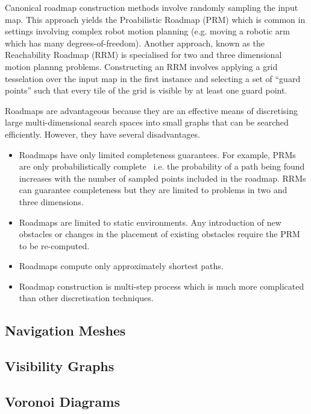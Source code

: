 Canonical roadmap construction methods involve randomly sampling the input map. 
This approach yields the Proabilistic Roadmap (PRM) which is common in settings 
involving complex robot motion planning (e.g. moving a robotic arm which has many 
degrees-of-freedom).
Another approach, known as the Reachability Roadmap (RRM) is specialised for two 
and three dimensional motion plannng problems.
Constructing an RRM involves applying a grid tesselation over the input map in the 
first instance and selecting a set of ``guard points'' such that every tile of the 
grid is visible by at least one guard point.

Roadmaps are advantageous because they are an effective means of discretising large
multi-dimensional search spaces into small graphs that can be searched 
efficiently. However, they have several disadvantages. 
\begin{itemize}
\item{Roadmaps have only limited completeness guarantees. For example, PRMs are only 
probabilistically complete~\citep{barraquand97} i.e. the probability 
of a path being found increases with the number of sampled points included in the 
roadmap.
RRMs can guarantee completeness but they are limited to problems in two and three 
dimensions.}
\item{Roadmaps are limited to static environments. Any introduction
of new obstacles or changes in the placement of existing obstacles require the PRM
to be re-computed.}
\item{Roadmaps compute only approximately shortest paths.}
\item{Roadmap construction is multi-step process which is much more complicated than 
other discretisation techniques.}
\end{itemize}

\subsection{Navigation Meshes}
\label{cha::lit::graphs::nav}

\subsection{Visibility Graphs}
\label{cha::lit::graphs::vis}

\subsection{Voronoi Diagrams}
\label{cha::lit::graphs::voronoi}

